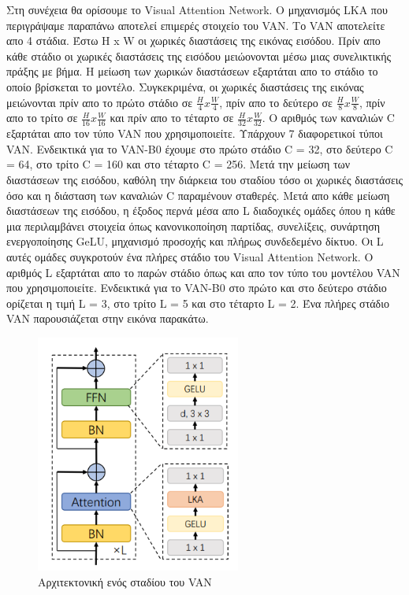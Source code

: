 \documentclass[12pt]{article}
\numberwithin{equation}{section}
\begin{document}
Στη συνέχεια θα ορίσουμε το Visual Attention Network. Ο μηχανισμός LKA που περιγράψαμε παραπάνω αποτελεί επιμερές στοιχείο του VAN. Το VAN αποτελείτε απο 4 στάδια. Έστω H x W οι χωρικές διαστάσεις της εικόνας εισόδου. Πρίν απο κάθε στάδιο οι χωρικές διαστάσεις της εισόδου μειώονονται μέσω μιας συνελικτικής πράξης με βήμα. Η μείωση των χωρικών διαστάσεων εξαρτάται απο το στάδιο το οποίο βρίσκεται το μοντέλο. Συγκεκριμένα, οι χωρικές διαστάσεις της εικόνας μειώνονται πρίν απο το πρώτο στάδιο σε \(\frac{H}{4} x \frac{W}{4}\), πρίν απο το δεύτερο σε \(\frac{H}{8} x \frac{W}{8}\), πρίν απο το τρίτο σε \(\frac{H}{16} x \frac{W}{16}\) και πρίν απο το τέταρτο σε \(\frac{H}{32} x \frac{W}{32}\). Ο αριθμός των καναλιών C εξαρτάται απο τον τύπο VAN που χρησιμοποιείτε. Υπάρχουν 7 διαφορετικοί τύποι VAN. Ενδεικτικά για το VAN-B0 έχουμε στο πρώτο στάδιο C = 32, στο δεύτερο C = 64, στο τρίτο C = 160 και στο τέταρτο C = 256. Μετά την μείωση των διαστάσεων της εισόδου, καθόλη την διάρκεια του σταδίου τόσο οι χωρικές διαστάσεις όσο και η διάσταση των καναλιών C παραμένουν σταθερές. Μετά απο κάθε μείωση διαστάσεων της εισόδου, η έξοδος περνά μέσα απο L διαδοχικές ομάδες όπου η κάθε μια περιλαμβάνει στοιχεία όπως κανονικοποίηση παρτίδας, συνελίξεις, συνάρτηση ενεργοποίησης GeLU, μηχανισμό προσοχής και πλήρως συνδεδεμένο δίκτυο. Οι L αυτές ομάδες συγκροτούν ένα πλήρες στάδιο του Visual Attention Network. Ο αριθμός L εξαρτάται απο το παρών στάδιο όπως και απο τον τύπο του μοντέλου VAN που χρησιμοποιείτε. Ενδεικτικά για το VAN-B0 στο πρώτο και στο δεύτερο στάδιο ορίζεται η τιμή L = 3, στο τρίτο L = 5 και στο τέταρτο L = 2. Ένα πλήρες στάδιο VAN παρουσιάζεται στην εικόνα παρακάτω.\\

\begin{figure}[h!]
  \centering
  \includegraphics[width=0.6\textwidth]{images/VAN_Stage.png} %
  \caption{Αρχιτεκτονική ενός σταδίου του VAN}
  \label{figure 20}
\end{figure} 
\end{document}

